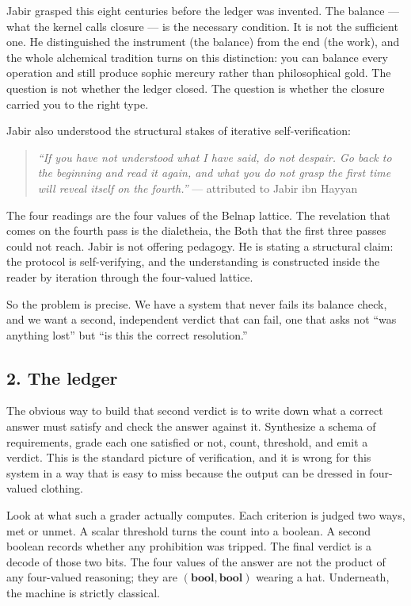 \documentclass[12pt,a4paper]{article}
\begin{document}
Jabir grasped this eight centuries before the ledger was invented. The
balance --- what the kernel calls closure --- is the necessary
condition. It is not the sufficient one. He distinguished the instrument
(the balance) from the end (the work), and the whole alchemical
tradition turns on this distinction: you can balance every operation and
still produce sophic mercury rather than philosophical gold. The
question is not whether the ledger closed. The question is whether the
closure carried you to the right type.

Jabir also understood the structural stakes of iterative
self-verification:

\begin{quote}
\emph{``If you have not understood what I have said, do not despair. Go
back to the beginning and read it again, and what you do not grasp the
first time will reveal itself on the fourth.''} --- attributed to Jabir
ibn Hayyan
\end{quote}

The four readings are the four values of the Belnap lattice. The
revelation that comes on the fourth pass is the dialetheia, the Both
that the first three passes could not reach. Jabir is not offering
pedagogy. He is stating a structural claim: the protocol is
self-verifying, and the understanding is constructed inside the reader
by iteration through the four-valued lattice.

So the problem is precise. We have a system that never fails its balance
check, and we want a second, independent verdict that can fail, one that
asks not ``was anything lost'' but ``is this the correct resolution.''

\hypertarget{the-ledger}{%
\subsection{2. The ledger}\label{the-ledger}}

The obvious way to build that second verdict is to write down what a
correct answer must satisfy and check the answer against it. Synthesize
a schema of requirements, grade each one satisfied or not, count,
threshold, and emit a verdict. This is the standard picture of
verification, and it is wrong for this system in a way that is easy to
miss because the output can be dressed in four-valued clothing.

Look at what such a grader actually computes. Each criterion is judged
two ways, met or unmet. A scalar threshold turns the count into a
boolean. A second boolean records whether any prohibition was tripped.
The final verdict is a decode of those two bits. The four values of the
answer are not the product of any four-valued reasoning; they are
\(\mathbf{(bool, bool)}\) wearing a hat. Underneath, the machine is
strictly classical.
\end{document}
